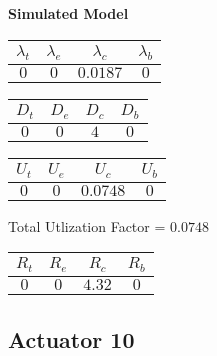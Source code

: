 \documentclass{article}
\begin{document}
\begin{minipage}{0.5\textwidth}
\centering	\textbf{Simulated Model}
\begin{table}[H]
\centering
\begin{tabular}{@{}cccc@{}}
\toprule
$\lambda_t$ & $\lambda_e$ & $\lambda_c$ & $\lambda_b$\\
\midrule
$0$ & $0$ & $0.0187$ & $0$\\
\bottomrule
\end{tabular}
\end{table}
\begin{table}[H]
\centering
\begin{tabular}{@{}cccc@{}}
\toprule
$D_t$ & $D_e$ & $D_c$ & $D_b$\\
\midrule
$0$ & $0$ & $4$ & $0$\\
\bottomrule
\end{tabular}
\end{table}\begin{table}[H]
\centering
\begin{tabular}{@{}cccc@{}}
\toprule
$U_t$ & $U_e$ & $U_c$ & $U_b$\\
\midrule
$0$ & $0$ & $0.0748$ & $0$\\
\bottomrule
\end{tabular}
\end{table}
\centering Total Utlization Factor = $0.0748$
\begin{table}[H]
\centering
\begin{tabular}{@{}cccc@{}}
\toprule
$R_t$ & $R_e$ & $R_c$ & $R_b$\\
\midrule
$0$ & $0$ & $4.32$ & $0$\\
\bottomrule
\end{tabular}
\end{table}
\end{minipage}\subsection{Actuator 10}
\end{document}
